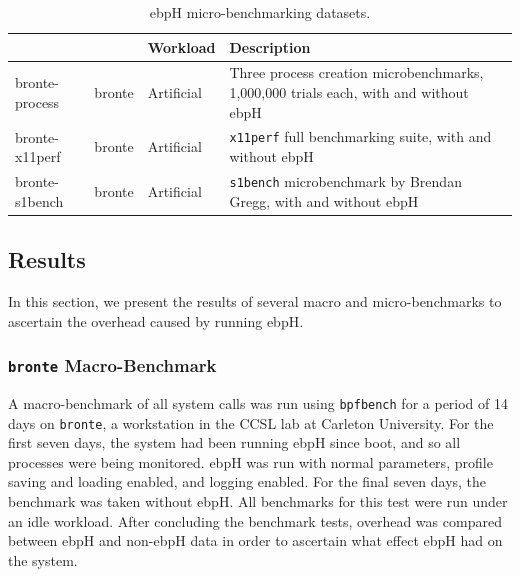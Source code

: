 \documentclass[
  12pt]{findlay}
\begin{document}
\begin{table}
\caption{ebpH micro-benchmarking datasets.}
\label{micro-datasets}
\begin{tabular}{>{\ttfamily}l>{\ttfamily}llp{2.3in}}
\toprule
\multicolumn{1}{l}{Dataset} & \multicolumn{1}{l}{System} & Workload & Description \\
\midrule
    bronte-process & bronte & Artificial & Three process creation microbenchmarks, 1,000,000 trials each, with and without ebpH \\
    bronte-x11perf & bronte & Artificial & \texttt{x11perf} \cite{x11perf, x11perfcomp} full benchmarking suite, with and without ebpH \\
    bronte-s1bench & bronte & Artificial & \texttt{s1bench} \cite{s1bench} microbenchmark by Brendan Gregg, with and without ebpH \\
\bottomrule
\end{tabular}
\end{table}

\hypertarget{results}{%
\subsection{Results}\label{results}}

\label{results-section}

In this section, we present the results of several macro and
micro-benchmarks to ascertain the overhead caused by running ebpH.

\hypertarget{bronte-macro-benchmark}{%
\subsubsection{\texorpdfstring{\texttt{bronte}
Macro-Benchmark}{bronte Macro-Benchmark}}\label{bronte-macro-benchmark}}

A macro-benchmark of all system calls was run using
\passthrough{\lstinline!bpfbench!} for a period of 14 days on
\passthrough{\lstinline!bronte!}, a workstation in the CCSL lab at
Carleton University. For the first seven days, the system had been
running ebpH since boot, and so all processes were being monitored. ebpH
was run with normal parameters, profile saving and loading enabled, and
logging enabled. For the final seven days, the benchmark was taken
without ebpH. All benchmarks for this test were run under an idle
workload. After concluding the benchmark tests, overhead was compared
between ebpH and non-ebpH data in order to ascertain what effect ebpH
had on the system.
\end{document}
